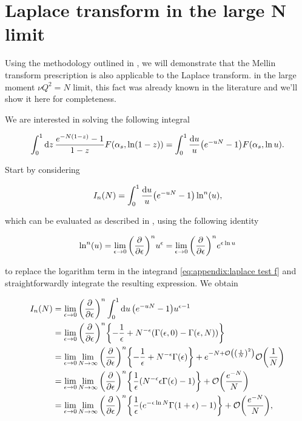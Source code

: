 \documentclass[../Tesi_Jiahao_Miao_986136.tex]{subfiles}
\begin{document}
\chapter{Laplace transform in the large N limit} \label{Appendix: Laplace and Mellin transform}

Using the methodology outlined in \cite{Catani_2003_appendix}, we will demonstrate that the Mellin transform prescription is also applicable to the Laplace transform.
in the large moment $\nu Q^2 = N$ limit, this fact was already known in the literature \cite{CATAN_large_chi} and we'll show it here for completeness.

We are interested in solving the following integral

\begin{equation}
    \int_0^1 \dd{z} \frac{e^{- N (1-z)} - 1}{1-z} F\qty(\alpha_s,\ln(1-z))= \int_0^1 \frac{\dd{u}}{u} \qty(e^{-u N} - 1) F\qty(\alpha_s , \ln u).
\end{equation}

Start by considering 

\begin{equation}\label{eq:appendix:laplace test f}
    I_n(N) = \int_0^1 \frac{\dd{u}}{u} \qty(e^{-u N} - 1) \ln^n(u) ,
\end{equation}

which can be evaluated as described in \cite{CATANI1989323}, using the following identity

\begin{equation}
    \ln^n(u)= \lim_{\epsilon \to 0} \qty(\pdv{\epsilon})^n u^\epsilon = \lim_{\epsilon \to 0} \qty(\pdv{\epsilon})^n e^{\epsilon \ln u}
\end{equation}

to replace the logarithm term in the integrand \cref{eq:appendix:laplace test f} and straightforwardly integrate the resulting expression. We obtain

\begin{align}
    \begin{split}\label{eq:appendix:calculation}
    I_n(N) &= \lim_{\epsilon \to 0} \qty(\pdv{\epsilon})^n \int_0^1 \dd{u} \qty(e^{-u N} - 1) u^{\epsilon-1} \\
    &= \lim_{\epsilon \to 0} \qty(\pdv{\epsilon})^n \qty{-\frac{1}{\epsilon}+N^{-\epsilon} (\Gamma(\epsilon,0) - \Gamma(\epsilon,N))} \\
    &= \lim_{\epsilon \to 0} \lim_{N \to \infty} \qty(\pdv{\epsilon})^n \qty{-\frac{1}{\epsilon}+N^{-\epsilon} \Gamma(\epsilon)}+ e^{-N + \order{\qty(\frac{1}{N})^2}}\order{\frac{1}{N}} \\
    &= \lim_{\epsilon \to 0} \lim_{N \to \infty} \qty(\pdv{\epsilon})^n \qty{\frac{1}{\epsilon} (N^{-\epsilon} \epsilon \Gamma(\epsilon) -1)} + \order{\frac{e^{-N}}{N}}\\
    &= \lim_{\epsilon \to 0} \lim_{N \to \infty} \qty(\pdv{\epsilon})^n \qty{\frac{1}{\epsilon} ( e^{-\epsilon \ln N} \Gamma(1+\epsilon) -1)} + \order{\frac{e^{-N}}{N}},
    \end{split}
\end{align}
\end{document}

